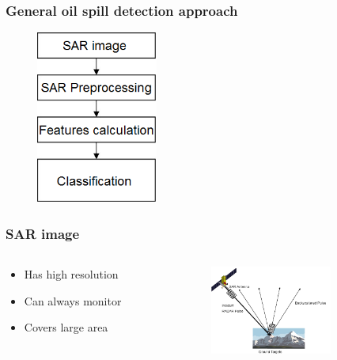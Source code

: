\documentclass{beamer}
\begin{document}
\begin{frame}
\frametitle{General oil spill detection approach}
\begin{figure}
	\centering
    \includegraphics[width=40mm,scale=1]{./img/basicsteps.png}
\end{figure}



\end{frame}
\begin{frame}
\frametitle{SAR image}
\begin{columns}[T]
    \begin{column}{.5\textwidth}

\begin{itemize}
	\item Has high resolution
	\item Can always monitor
	\item Covers large area 

\end{itemize}
\end{column}
\begin{column}{.5\textwidth}
\begin{figure}
	\centering
    \includegraphics[width=40mm,scale=1]{./img/SARexplained.png}
\end{figure}
\end{column}
\end{columns}

\end{frame}

\end{document}
